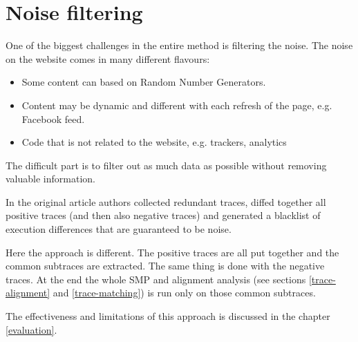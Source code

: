 



\section{Noise filtering}

One of the biggest challenges in the entire method is filtering the noise.
The noise on the website comes in many different flavours:
\begin{itemize}
  \item Some content can based on Random Number Generators.
  \item Content may be dynamic and different with each refresh of the page, e.g. Facebook feed.
  \item Code that is not related to the website, e.g. trackers, analytics
\end{itemize}

The difficult part is to filter out as much data as possible without removing valuable information.

In the original article authors collected redundant traces, diffed together all positive traces (and then also negative traces)
and generated a blacklist of execution differences that are guaranteed to be noise.

Here the approach is different. The positive traces are all put together and the common subtraces are extracted.
The same thing is done with the negative traces. 
At the end the whole SMP and alignment analysis (see sections \ref{trace-alignment} and \ref{trace-matching}) 
is run only on those common subtraces.

The effectiveness and limitations of this approach is discussed in the chapter \ref{evaluation}.



